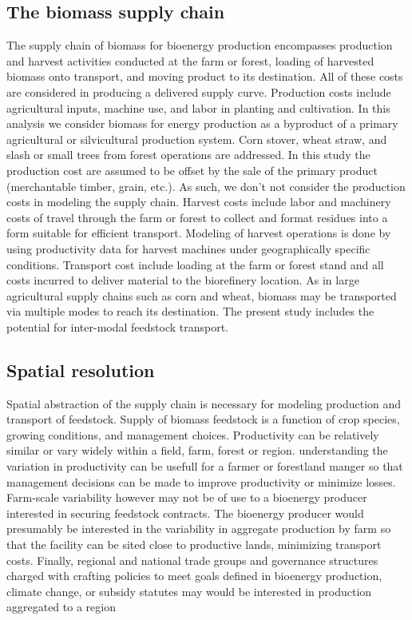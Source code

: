\documentclass[review,3p,authoryear,times]{elsarticle}
\begin{document}
\subsection{The biomass supply chain}
The supply chain of biomass for bioenergy production encompasses production and harvest activities conducted at the farm or forest, loading of harvested biomass onto transport, and moving product to its destination. All of these costs are considered  in producing a delivered supply curve. Production costs include agricultural inputs, machine use, and labor in planting and cultivation. In this analysis we consider biomass for energy production as a byproduct of a primary agricultural or silvicultural production system. Corn stover, wheat straw, and slash or small trees from forest operations are addressed. In this study the production cost are assumed to be offset by the sale of the primary product (merchantable timber, grain, etc.). As such, we don't not consider the production costs in modeling the supply chain.  Harvest costs include labor and machinery costs of travel through the farm or forest to collect and format residues into a form suitable for efficient transport.  Modeling of harvest operations is done by using productivity data for harvest machines under geographically specific conditions.  Transport cost include loading at the farm or forest stand and all costs incurred to deliver material to the biorefinery location. As in large agricultural supply chains such as corn and wheat, biomass may be transported via multiple modes to reach its destination. The present study includes the potential for inter-modal feedstock transport.  

\subsection{Spatial resolution}

Spatial abstraction of the supply chain is necessary for modeling production and transport of feedstock. Supply of biomass feedstock is a function of crop species, growing conditions, and management choices. Productivity can be relatively similar or vary widely within a field, farm, forest or region. understanding the variation in productivity can be usefull for a farmer or forestland manger so that management decisions can be made to improve productivity or minimize losses. Farm-scale variability however may not be of use to a bioenergy producer interested in securing feedstock contracts. The bioenergy producer would presumably be interested in the variability in aggregate production by farm so that the facility can be sited close to productive lands, minimizing transport costs. Finally, regional and national trade groups and governance structures charged with crafting policies to meet goals defined in bioenergy production, climate change, or subsidy statutes may would be interested in production aggregated to a region  
\end{document}
